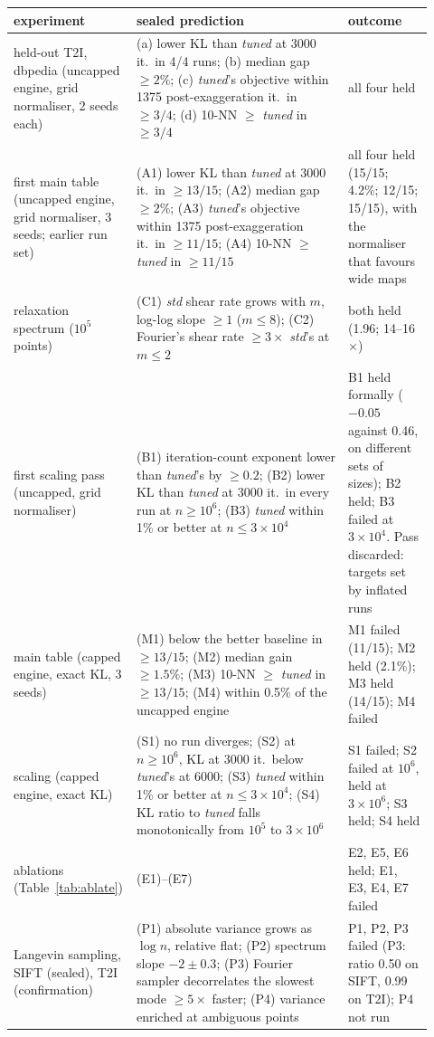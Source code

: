 \begin{tabular}{p{0.22\linewidth}p{0.50\linewidth}p{0.20\linewidth}}\toprule
experiment & sealed prediction & outcome\\\midrule
held-out T2I, dbpedia (uncapped engine, grid normaliser, 2 seeds each) & (a) lower KL than \emph{tuned} at 3000 it.\ in 4/4 runs; (b) median gap $\ge2\%$; (c) \emph{tuned}'s objective within 1375 post-exaggeration it.\ in $\ge3/4$; (d) 10-NN $\ge$ \emph{tuned} in $\ge3/4$ & all four held\\
first main table (uncapped engine, grid normaliser, 3 seeds; earlier run set) & (A1) lower KL than \emph{tuned} at 3000 it.\ in $\ge13/15$; (A2) median gap $\ge2\%$; (A3) \emph{tuned}'s objective within 1375 post-exaggeration it.\ in $\ge11/15$; (A4) 10-NN $\ge$ \emph{tuned} in $\ge11/15$ & all four held (15/15; 4.2\%; 12/15; 15/15), with the normaliser that favours wide maps\\
relaxation spectrum ($10^5$ points) & (C1) \emph{std} shear rate grows with $m$, log-log slope $\ge1$ ($m\le8$); (C2) Fourier's shear rate $\ge3\times$ \emph{std}'s at $m\le2$ & both held (1.96; 14--16$\times$)\\
first scaling pass (uncapped, grid normaliser) & (B1) iteration-count exponent lower than \emph{tuned}'s by $\ge0.2$; (B2) lower KL than \emph{tuned} at 3000 it.\ in every run at $n\ge10^6$; (B3) \emph{tuned} within 1\% or better at $n\le3\times10^4$ & B1 held formally ($-0.05$ against 0.46, on different sets of sizes); B2 held; B3 failed at $3\times10^4$. Pass discarded: targets set by inflated runs\\
main table (capped engine, exact KL, 3 seeds) & (M1) below the better baseline in $\ge13/15$; (M2) median gain $\ge1.5\%$; (M3) 10-NN $\ge$ \emph{tuned} in $\ge13/15$; (M4) within 0.5\% of the uncapped engine & M1 failed (11/15); M2 held (2.1\%); M3 held (14/15); M4 failed\\
scaling (capped engine, exact KL) & (S1) no run diverges; (S2) at $n\ge10^6$, KL at 3000 it.\ below \emph{tuned}'s at 6000; (S3) \emph{tuned} within 1\% or better at $n\le3\times10^4$; (S4) KL ratio to \emph{tuned} falls monotonically from $10^5$ to $3\times10^6$ & S1 failed; S2 failed at $10^6$, held at $3\times10^6$; S3 held; S4 held\\
ablations (Table~\ref{tab:ablate}) & (E1)--(E7) & E2, E5, E6 held; E1, E3, E4, E7 failed\\
Langevin sampling, SIFT (sealed), T2I (confirmation) & (P1) absolute variance grows as $\log n$, relative flat; (P2) spectrum slope $-2\pm0.3$; (P3) Fourier sampler decorrelates the slowest mode $\ge5\times$ faster; (P4) variance enriched at ambiguous points & P1, P2, P3 failed (P3: ratio 0.50 on SIFT, 0.99 on T2I); P4 not run\\

\end{tabular}
